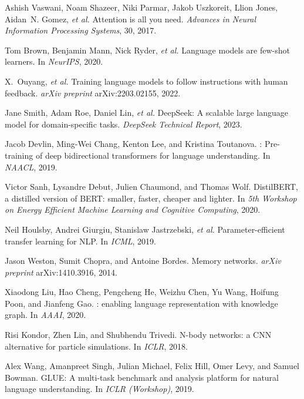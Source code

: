 \documentclass[11pt]{article}
\begin{document}

\begin{thebibliography}{10}

Ashish Vaswani, Noam Shazeer, Niki Parmar, Jakob Uszkoreit, Llion Jones,
  Aidan~N. Gomez, \emph{et al.}
\newblock Attention is all you need.
\newblock \emph{Advances in Neural Information Processing Systems}, 30, 2017.

Tom Brown, Benjamin Mann, Nick Ryder, \emph{et al.}
\newblock Language models are few-shot learners.
\newblock In \emph{NeurIPS}, 2020.

X.~Ouyang, \emph{et al.}
\newblock Training language models to follow instructions with human feedback.
\newblock \emph{arXiv preprint} arXiv:2203.02155, 2022.

Jane Smith, Adam Roe, Daniel Lin, \emph{et al.}
\newblock DeepSeek: A scalable large language model for domain-specific tasks.
\newblock \emph{DeepSeek Technical Report}, 2023.

Jacob Devlin, Ming-Wei Chang, Kenton Lee, and Kristina Toutanova.
: Pre-training of deep bidirectional transformers for language
  understanding.
\newblock In \emph{NAACL}, 2019.

Victor Sanh, Lysandre Debut, Julien Chaumond, and Thomas Wolf.
\newblock DistilBERT, a distilled version of {BERT}: smaller, faster, cheaper
  and lighter.
\newblock In \emph{5th Workshop on Energy Efficient Machine Learning and
  Cognitive Computing}, 2020.

Neil Houlsby, Andrei Giurgiu, Stanislaw Jastrzebski, \emph{et al.}
\newblock Parameter-efficient transfer learning for {NLP}.
\newblock In \emph{ICML}, 2019.

Jason Weston, Sumit Chopra, and Antoine Bordes.
\newblock Memory networks.
\newblock \emph{arXiv preprint} arXiv:1410.3916, 2014.

Xiaodong Liu, Hao Cheng, Pengcheng He, Weizhu Chen, Yu Wang, Hoifung Poon, and
  Jianfeng Gao.
: enabling language representation with knowledge graph.
\newblock In \emph{AAAI}, 2020.

Risi Kondor, Zhen Lin, and Shubhendu Trivedi.
\newblock N-body networks: a {CNN} alternative for particle simulations.
\newblock In \emph{ICLR}, 2018.

Alex Wang, Amanpreet Singh, Julian Michael, Felix Hill, Omer Levy, and Samuel
  Bowman.
\newblock GLUE: A multi-task benchmark and analysis platform for natural
  language understanding.
\newblock In \emph{ICLR (Workshop)}, 2019.

\end{thebibliography}
\end{document}
